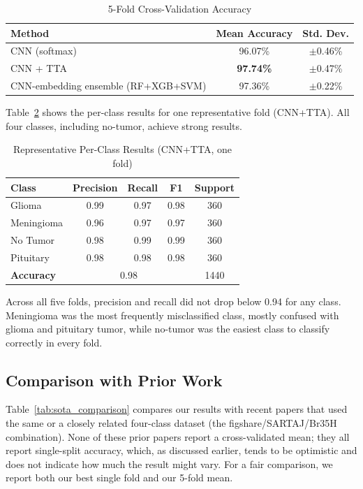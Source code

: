 \documentclass[conference]{IEEEtran}
\begin{document}
\begin{table}[!htbp]
\centering
\caption{5-Fold Cross-Validation Accuracy}
\begin{tabular}{|l|c|c|}
\hline
\textbf{Method} & \textbf{Mean Accuracy} & \textbf{Std. Dev.} \\ \hline
CNN (softmax)                          & 96.07\% & $\pm$0.46\% \\ \hline
CNN + TTA                              & \textbf{97.74\%} & $\pm$0.47\% \\ \hline
CNN-embedding ensemble (RF+XGB+SVM)    & 97.36\% & $\pm$0.22\% \\ \hline
\end{tabular}
\label{tab:cv_results}
\end{table}

Table~\ref{tab:perclass} shows the per-class results for one representative fold (CNN+TTA). All four classes, including no-tumor, achieve strong results.

\begin{table}[!htbp]
\centering
\caption{Representative Per-Class Results (CNN+TTA, one fold)}
\begin{tabular}{|l|c|c|c|c|}
\hline
\textbf{Class} & \textbf{Precision} & \textbf{Recall} & \textbf{F1} & \textbf{Support} \\ \hline
Glioma      & 0.99 & 0.97 & 0.98 & 360 \\ \hline
Meningioma  & 0.96 & 0.97 & 0.97 & 360 \\ \hline
No Tumor    & 0.98 & 0.99 & 0.99 & 360 \\ \hline
Pituitary   & 0.98 & 0.98 & 0.98 & 360 \\ \hline
\textbf{Accuracy} & \multicolumn{3}{c|}{0.98} & 1440 \\ \hline
\end{tabular}
\label{tab:perclass}
\end{table}

Across all five folds, precision and recall did not drop below 0.94 for any class. Meningioma was the most frequently misclassified class, mostly confused with glioma and pituitary tumor, while no-tumor was the easiest class to classify correctly in every fold.

\subsection{Comparison with Prior Work}
Table~\ref{tab:sota_comparison} compares our results with recent papers that used the same or a closely related four-class dataset (the figshare/SARTAJ/Br35H combination). None of these prior papers report a cross-validated mean; they all report single-split accuracy, which, as discussed earlier, tends to be optimistic and does not indicate how much the result might vary. For a fair comparison, we report both our best single fold and our 5-fold mean.
\end{document}
